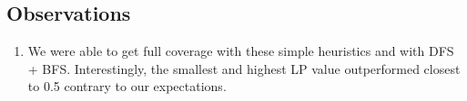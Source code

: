 \subsection*{Observations}
\begin{enumerate}
    \item We were able to get full coverage with these simple heuristics and with DFS + BFS. Interestingly, the smallest and highest LP value outperformed closest to 0.5 contrary to our expectations. 
\end{enumerate}
